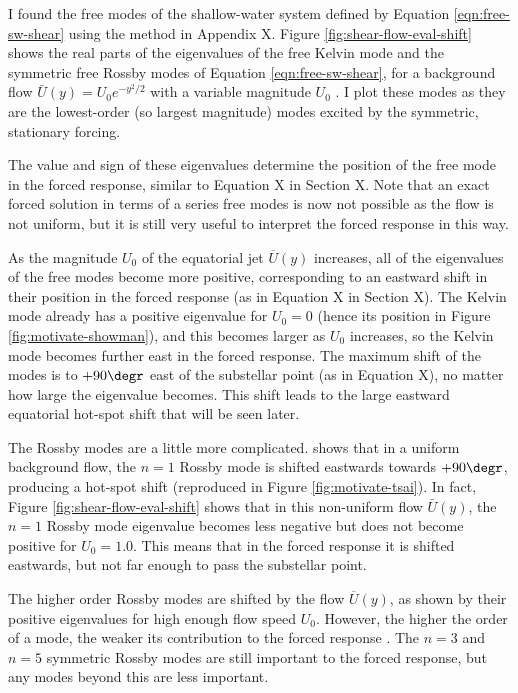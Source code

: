 I found the free modes of the shallow-water system defined by Equation \ref{eqn:free-sw-shear} using the method in Appendix X. Figure \ref{fig:shear-flow-eval-shift} shows the real parts of the eigenvalues of the free Kelvin mode and the symmetric free Rossby modes of Equation \ref{eqn:free-sw-shear}, for a background flow $\bar{U}(y)=U_{0}e^{-y^{2}/2}$ with a variable magnitude $U_{0}$ \citep{hammond2018wavemean}. I plot these modes as they are the lowest-order (so largest magnitude) modes excited by the symmetric, stationary forcing.

The value and sign of these eigenvalues determine the position of the free mode in the forced response, similar to Equation X in Section X. Note that an exact forced solution in terms of a series free modes is now not possible as the flow is not uniform, but it is still very useful to interpret the forced response in this way.

As the magnitude $U_{0}$ of the equatorial jet $\overline{U}(y)$ increases, all of the eigenvalues of the free modes become more positive, corresponding to an eastward shift in their position in the forced response (as in Equation X in Section X). The Kelvin mode already has a positive eigenvalue for $U_{0}=0$ (hence its position in Figure \ref{fig:motivate-showman}), and this becomes larger as $U_{0}$ increases, so the Kelvin mode becomes further east in the forced response. The maximum shift of the modes is to $+90\degr$ east of the substellar point (as in Equation X), no matter how large the eigenvalue becomes. This shift leads to the large eastward equatorial hot-spot shift that will be seen later.

The Rossby modes are a little more complicated. \citet{tsai2014three} shows that in a uniform background flow, the $n=1$ Rossby mode is shifted eastwards towards $+90\degr$, producing a hot-spot shift (reproduced in Figure \ref{fig:motivate-tsai}). In fact, Figure \ref{fig:shear-flow-eval-shift} shows that in this non-uniform flow $\bar{U}(y)$, the $n=1$ Rossby mode eigenvalue becomes less negative but does not become positive for $U_{0}=1.0$. This means that in the forced response it is shifted eastwards, but not far enough to pass the substellar point.

The higher order Rossby modes are shifted by the flow $\overline{U}(y)$, as shown by their positive eigenvalues for high enough flow speed $U_{0}$. However, the higher the order of a mode, the weaker its contribution to the forced response \citep{matsuno1966quasi}. The $n=3$ and $n=5$ symmetric Rossby modes are still important to the forced response, but any modes beyond this are less important.

